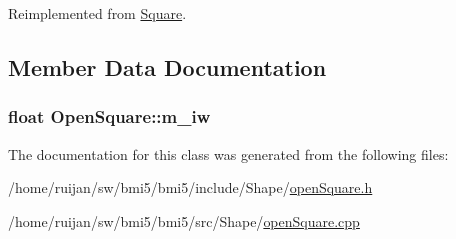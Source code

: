 Reimplemented from \hyperlink{classSquare_aedaf26740b0f71c086886d5519cf44a6}{Square}.



\subsection{Member Data Documentation}
\hypertarget{classOpenSquare_ae85dd099f8da8e1d0b8486067632006a}{
\subsubsection[{m\-\_\-iw}]{\setlength{\rightskip}{0pt plus 5cm}float Open\-Square\-::m\-\_\-iw\hspace{0.3cm}{\ttfamily [private]}}}\label{classOpenSquare_ae85dd099f8da8e1d0b8486067632006a}


The documentation for this class was generated from the following files\-:\begin{DoxyCompactItemize}
\item 
/home/ruijan/sw/bmi5/bmi5/include/\-Shape/\hyperlink{openSquare_8h}{open\-Square.\-h}\item 
/home/ruijan/sw/bmi5/bmi5/src/\-Shape/\hyperlink{openSquare_8cpp}{open\-Square.\-cpp}\end{DoxyCompactItemize}
